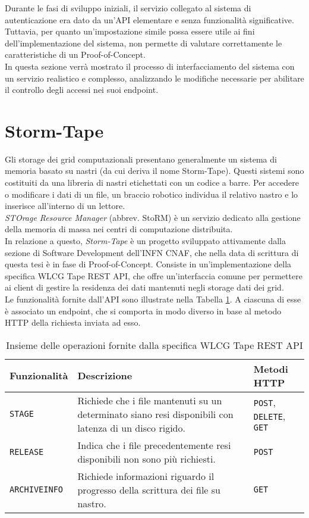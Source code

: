 Durante le fasi di sviluppo iniziali, il servizio collegato al sistema di autenticazione era dato da un'API
elementare e senza funzionalità significative.
\\ Tuttavia, per quanto un'impostazione simile possa essere utile ai fini dell'implementazione del sistema, non 
permette di valutare correttamente le caratteristiche di un Proof-of-Concept.
\\ In questa sezione verrà mostrato il processo di interfacciamento del sistema con un servizio 
realistico e complesso, analizzando le modifiche necessarie per abilitare il controllo degli accessi
nei suoi endpoint. 

\section{Storm-Tape}
Gli storage dei grid computazionali presentano generalmente un sistema di memoria basato su nastri (da cui deriva il nome Storm-Tape). 
Questi sistemi sono costituiti da una libreria di nastri etichettati con un codice a barre. Per accedere o modificare i dati di un file, 
un braccio robotico individua il relativo nastro e lo inserisce all'interno di un lettore.
\\ \textit{STOrage Resource Manager} (abbrev. StoRM) è un servizio dedicato alla gestione della memoria 
di massa nei centri di computazione distribuita. \\ In relazione a questo, \textit{Storm-Tape} è un progetto sviluppato
 attivamente dalla sezione di Software Development dell'INFN CNAF, che nella data di scrittura di questa tesi è in fase di Proof-of-Concept.
Consiste in un'implementazione della specifica {WLCG Tape REST API}, che offre un'interfaccia comune per permettere 
ai client di gestire la residenza dei dati mantenuti negli storage dati dei grid. 
\\ Le funzionalità fornite dall'API sono illustrate nella Tabella \ref*{tab:table-name}. A ciascuna di esse è associato un endpoint,
 che si comporta in modo diverso in base al metodo HTTP della richiesta inviata ad esso. 

\begin{table}
\begin{center}
\begin{tabular}{ | m{7em} | m{15em} | m{7em} | } 
  \hline
  \textbf{Funzionalità} & \textbf{Descrizione} & \textbf{Metodi HTTP}\\ 
  \hline
  \texttt{STAGE} & Richiede che i file mantenuti su un determinato siano resi disponibili con latenza di un disco rigido. & \texttt{POST}, \texttt{DELETE}, \texttt{GET}\\ 
  \hline
  \texttt{RELEASE} & Indica che i file precedentemente resi disponibili non sono più richiesti. & \texttt{POST}\\ 
  \hline
  \texttt{ARCHIVEINFO} & Richiede informazioni riguardo il progresso della scrittura dei file su nastro. & \texttt{GET}\\ 
  \hline
\end{tabular}
\caption{\label{tab:table-name} Insieme delle operazioni fornite dalla specifica WLCG Tape REST API}
\end{center}
\end{table}

